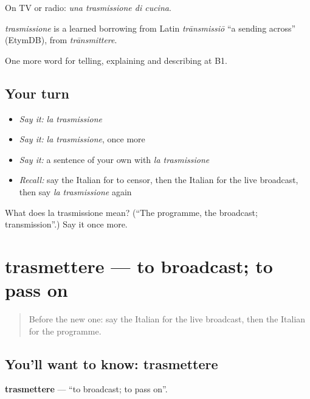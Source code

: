 On TV or radio: \emph{una trasmissione di cucina}.

\begin{cousinweb}
\emph{trasmissione} is a learned borrowing from Latin \emph{trānsmissiō} \textquotedblleft{}a sending across\textquotedblright{} (EtymDB), from \emph{trānsmittere}.
\end{cousinweb}

\begin{grammarlens}[title={What you've built}]
One more word for telling, explaining and describing at B1.
\end{grammarlens}

\subsection*{Your turn}
\begin{itemize}
\raggedright
  \item \emph{Say it:} \emph{la trasmissione}
  \item \emph{Say it:} \emph{la trasmissione}, once more
  \item \emph{Say it:} a sentence of your own with \emph{la trasmissione}
  \item \emph{Recall:} say the Italian for to censor, then the Italian for the live broadcast, then say \emph{la trasmissione} again
\end{itemize}

\begin{tcolorbox}[breakable,colback=teal!4,colframe=teal!35!black,title={Before you move on}]
What does la trasmissione mean? (\textquotedblleft{}The programme, the broadcast; transmission\textquotedblright{}.) Say it once more.
\end{tcolorbox}
\section[trasmettere]{trasmettere — to broadcast; to pass on}

\label{lesson:IT-C287-trasmettere}



\begin{quote}
Before the new one: say the Italian for the live broadcast, then the Italian for the programme.
\end{quote}

\subsection*{You'll want to know: trasmettere}
\textbf{trasmettere} — \textquotedblleft{}to broadcast; to pass on\textquotedblright{}.

